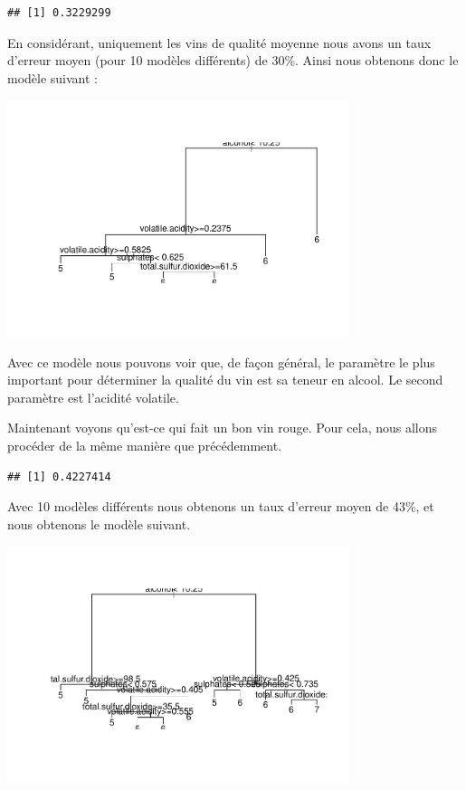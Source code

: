 \documentclass[
]{article}
\begin{document}
\begin{verbatim}
## [1] 0.3229299
\end{verbatim}

En considérant, uniquement les vins de qualité moyenne nous avons un
taux d'erreur moyen (pour 10 modèles différents) de 30\%. Ainsi nous
obtenons donc le modèle suivant :

\begin{center}
	\includegraphics[width=10cm]{repport_files/figure-latex/unnamed-chunk-20-1.pdf}
\end{center}

Avec ce modèle nous pouvons voir que, de façon général, le paramètre le plus
important pour déterminer la qualité du vin est sa teneur en alcool. Le
second paramètre est l'acidité volatile.

Maintenant voyons qu'est-ce qui fait un bon vin rouge. Pour cela, nous
allons procéder de la même manière que précédemment.

\begin{verbatim}
## [1] 0.4227414
\end{verbatim}

Avec 10 modèles différents nous obtenons un taux d'erreur moyen de 43\%,
et nous obtenons le modèle suivant.

\begin{center}
	\includegraphics[width=10cm]{repport_files/figure-latex/unnamed-chunk-22-1.pdf}
\end{center}
\end{document}
